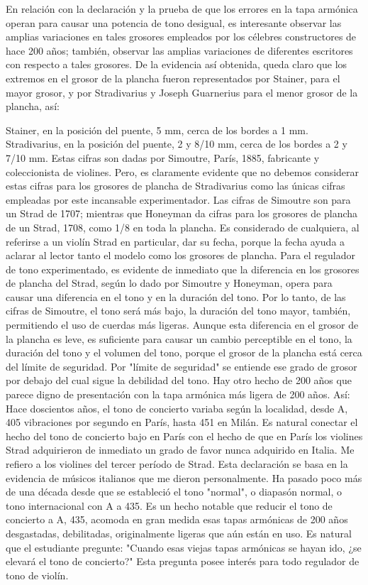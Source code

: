 \documentclass[12pt]{book}
\begin{document}
En relación con la declaración y la prueba de que los errores en la tapa armónica operan para causar una potencia de tono desigual, es interesante observar las amplias variaciones en tales grosores empleados por los célebres constructores de hace 200 años; también, observar las amplias variaciones de diferentes escritores con respecto a tales grosores. De la evidencia así obtenida, queda claro que los extremos en el grosor de la plancha fueron representados por Stainer, para el mayor grosor, y por Stradivarius y Joseph Guarnerius para el menor grosor de la plancha, así:

Stainer, en la posición del puente, 5 mm, cerca de los bordes a 1 mm. Stradivarius, en la posición del puente, 2 y 8/10 mm, cerca de los bordes a 2 y 7/10 mm. Estas cifras son dadas por Simoutre, París, 1885, fabricante y coleccionista de violines. Pero, es claramente evidente que no debemos considerar estas cifras para los grosores de plancha de Stradivarius como las únicas cifras empleadas por este incansable experimentador. Las cifras de Simoutre son para un Strad de 1707; mientras que Honeyman da cifras para los grosores de plancha de un Strad, 1708, como 1/8 en toda la plancha. Es considerado de cualquiera, al referirse a un violín Strad en particular, dar su fecha, porque la fecha ayuda a aclarar al lector tanto el modelo como los grosores de plancha. Para el regulador de tono experimentado, es evidente de inmediato que la diferencia en los grosores de plancha del Strad, según lo dado por Simoutre y Honeyman, opera para causar una diferencia en el tono y en la duración del tono. Por lo tanto, de las cifras de Simoutre, el tono será más bajo, la duración del tono mayor, también, permitiendo el uso de cuerdas más ligeras. Aunque esta diferencia en el grosor de la plancha es leve, es suficiente para causar un cambio perceptible en el tono, la duración del tono y el volumen del tono, porque el grosor de la plancha está cerca del límite de seguridad. Por "límite de seguridad" se entiende ese grado de grosor por debajo del cual sigue la debilidad del tono. Hay otro hecho de 200 años que parece digno de presentación con la tapa armónica más ligera de 200 años. Así: Hace doscientos años, el tono de concierto variaba según la localidad, desde A, 405 vibraciones por segundo en París, hasta 451 en Milán. Es natural conectar el hecho del tono de concierto bajo en París con el hecho de que en París los violines Strad adquirieron de inmediato un grado de favor nunca adquirido en Italia. Me refiero a los violines del tercer período de Strad. Esta declaración se basa en la evidencia de músicos italianos que me dieron personalmente. Ha pasado poco más de una década desde que se estableció el tono "normal", o diapasón normal, o tono internacional con A a 435. Es un hecho notable que reducir el tono de concierto a A, 435, acomoda en gran medida esas tapas armónicas de 200 años desgastadas, debilitadas, originalmente ligeras que aún están en uso. Es natural que el estudiante pregunte: "Cuando esas viejas tapas armónicas se hayan ido, ¿se elevará el tono de concierto?" Esta pregunta posee interés para todo regulador de tono de violín.
\end{document}
